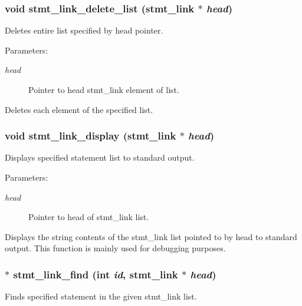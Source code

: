 \subsubsection{\setlength{\rightskip}{0pt plus 5cm}void stmt\_\-link\_\-delete\_\-list ({\bf stmt\_\-link} $\ast$ {\em head})}\label{link_8c_a19}


Deletes entire list specified by head pointer.

\begin{Desc}
\item[Parameters:]
\begin{description}
\item[{\em head}]Pointer to head stmt\_\-link element of list.\end{description}
\end{Desc}
Deletes each element of the specified list. 
\subsubsection{\setlength{\rightskip}{0pt plus 5cm}void stmt\_\-link\_\-display ({\bf stmt\_\-link} $\ast$ {\em head})}\label{link_8c_a7}


Displays specified statement list to standard output.

\begin{Desc}
\item[Parameters:]
\begin{description}
\item[{\em head}]Pointer to head of stmt\_\-link list.\end{description}
\end{Desc}
Displays the string contents of the stmt\_\-link list pointed to by head to standard output. This function is mainly used for debugging purposes. 
\subsubsection{$\ast$ stmt\_\-link\_\-find (int {\em id}, {\bf stmt\_\-link} $\ast$ {\em head})}\label{link_8c_a12}


Finds specified statement in the given stmt\_\-link list.

